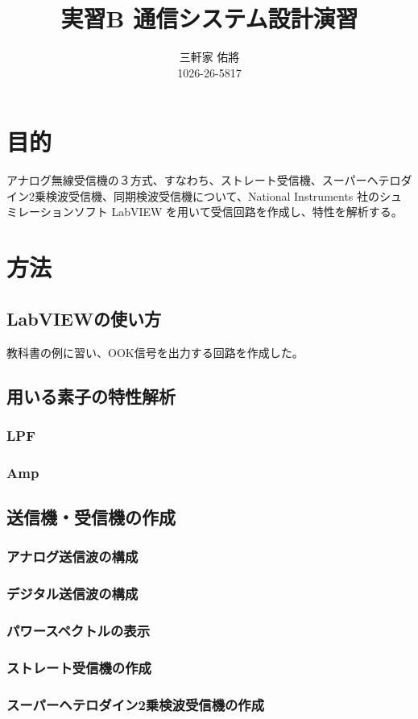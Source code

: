 \documentclass[11pt]{ltjsarticle}
\title{実習B 通信システム設計演習}
\author{三軒家 佑將 \\ 1026-26-5817}
\date{}
\begin{document}
\maketitle

\section{目的}
	アナログ無線受信機の３方式、すなわち、ストレート受信機、スーパーヘテロダイン2乗検波受信機、同期検波受信機について、National Instruments 社のシュミレーションソフト LabVIEW を用いて受信回路を作成し、特性を解析する。
\section{方法}
	\subsection{LabVIEWの使い方}
		教科書の例に習い、OOK信号を出力する回路を作成した。
	\subsection{用いる素子の特性解析}
		\subsubsection{LPF}
		\subsubsection{Amp}
	\subsection{送信機・受信機の作成}
		\subsubsection{アナログ送信波の構成}
		\subsubsection{デジタル送信波の構成}
		\subsubsection{パワースペクトルの表示}
		\subsubsection{ストレート受信機の作成}
		\subsubsection{スーパーヘテロダイン2乗検波受信機の作成}
\end{document}
